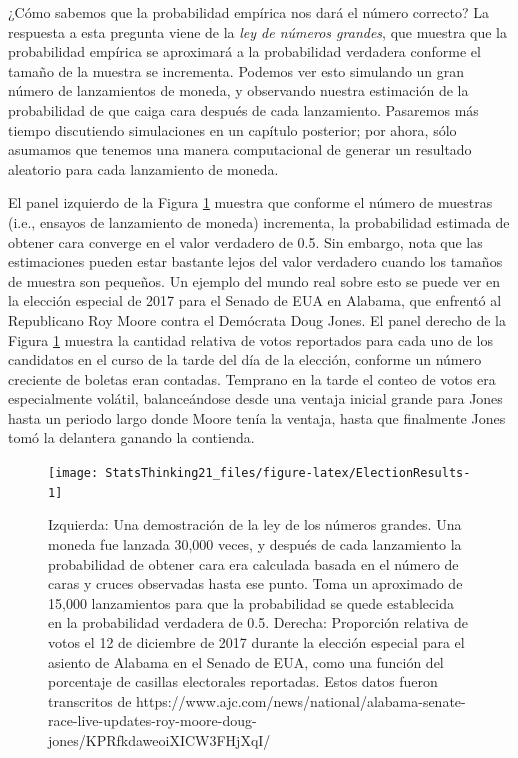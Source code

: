 \documentclass[
  12pt,
]{book}
\begin{document}
¿Cómo sabemos que la probabilidad empírica nos dará el número correcto? La respuesta a esta pregunta viene de la \emph{ley de números grandes}, que muestra que la probabilidad empírica se aproximará a la probabilidad verdadera conforme el tamaño de la muestra se incrementa. Podemos ver esto simulando un gran número de lanzamientos de moneda, y observando nuestra estimación de la probabilidad de que caiga cara después de cada lanzamiento. Pasaremos más tiempo discutiendo simulaciones en un capítulo posterior; por ahora, sólo asumamos que tenemos una manera computacional de generar un resultado aleatorio para cada lanzamiento de moneda.

El panel izquierdo de la Figura \ref{fig:ElectionResults} muestra que conforme el número de muestras (i.e., ensayos de lanzamiento de moneda) incrementa, la probabilidad estimada de obtener cara converge en el valor verdadero de 0.5. Sin embargo, nota que las estimaciones pueden estar bastante lejos del valor verdadero cuando los tamaños de muestra son pequeños. Un ejemplo del mundo real sobre esto se puede ver en la elección especial de 2017 para el Senado de EUA en Alabama, que enfrentó al Republicano Roy Moore contra el Demócrata Doug Jones. El panel derecho de la Figura \ref{fig:ElectionResults} muestra la cantidad relativa de votos reportados para cada uno de los candidatos en el curso de la tarde del día de la elección, conforme un número creciente de boletas eran contadas. Temprano en la tarde el conteo de votos era especialmente volátil, balanceándose desde una ventaja inicial grande para Jones hasta un periodo largo donde Moore tenía la ventaja, hasta que finalmente Jones tomó la delantera ganando la contienda.

\begin{figure}
\texttt{[image: StatsThinking21\_files/figure-latex/ElectionResults-1]} \caption{Izquierda: Una demostración de la ley de los números grandes. Una moneda fue lanzada 30,000 veces, y después de cada lanzamiento la probabilidad de obtener cara era calculada basada en el número de caras y cruces observadas hasta ese punto. Toma un aproximado de 15,000 lanzamientos para que la probabilidad se quede establecida en la probabilidad verdadera de 0.5. Derecha: Proporción relativa de votos el 12 de diciembre de 2017 durante la elección especial para el asiento de Alabama en el Senado de EUA, como una función del porcentaje de casillas electorales reportadas. Estos datos fueron transcritos de https://www.ajc.com/news/national/alabama-senate-race-live-updates-roy-moore-doug-jones/KPRfkdaweoiXICW3FHjXqI/ }\label{fig:ElectionResults}
\end{figure}
\end{document}
